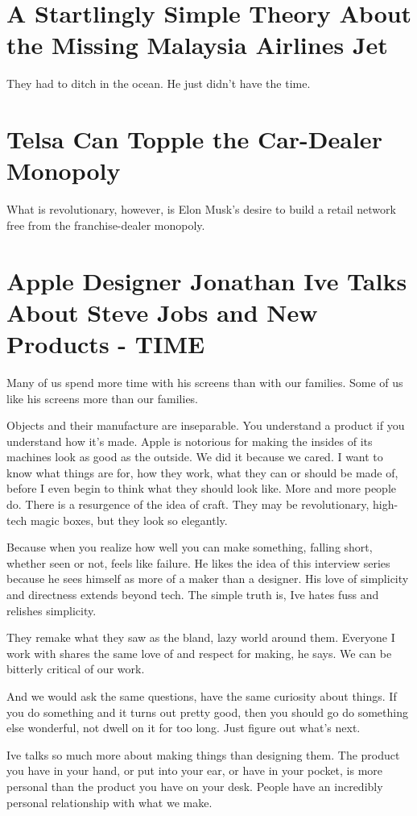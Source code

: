 \section{A Startlingly Simple Theory About the Missing Malaysia Airlines Jet}

They had to ditch in the ocean. He just didn't have the time.

\section{Telsa Can Topple the Car-Dealer Monopoly}
What is revolutionary, however, is Elon Musk's desire to build a retail network free from the franchise-dealer monopoly.

\section{Apple Designer Jonathan Ive Talks About Steve Jobs and New Products - TIME}
Many of us spend more time with his screens than with our families. Some of us like his screens more than our families.

Objects and their manufacture are inseparable. You understand a
product if you understand how it's made.
Apple is notorious for making the insides of its machines look as good as the outside.
We did it because we cared.
I want to know what things are for, how they work, what they can or should be made of, before I even begin to think what they should look like. More and more people do. There is a resurgence of the idea of craft.
They may be revolutionary, high-tech magic boxes, but they look so elegantly.

Because when you realize how well you can make something, falling short, whether seen or not, feels like failure.
He likes the idea of this interview series because he sees himself as more of a maker than a designer.
His love of simplicity and directness extends beyond tech.
The simple truth is, Ive hates fuss and relishes simplicity.

They remake what they saw as the bland, lazy world around them.
Everyone I work with shares the same love of and respect for making, he says.
We can be bitterly critical of our work.


And we would ask the same questions, have the same curiosity about things.
If you do something and it turns out pretty good, then you should go do something else wonderful, not dwell on it for too long. Just figure out what's next.

Ive talks so much more about making things than designing them.
The product you have in your hand, or put into your ear, or have in your pocket, is more personal than the product you have on your desk.
People have an incredibly personal relationship with what we make.

